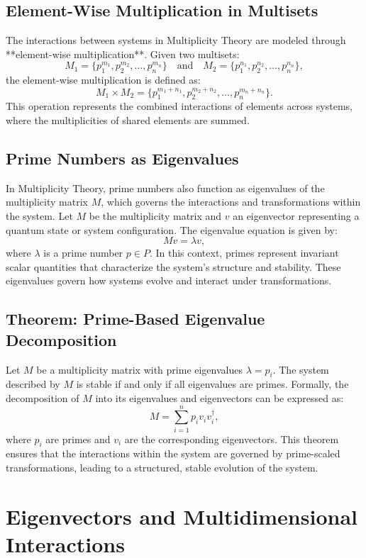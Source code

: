\documentclass[%
 preprint, linenumbers,
 amsmath,amssymb,
 aps, physrev,
]{revtex4-2}
\begin{document}
\subsection{Element-Wise Multiplication in Multisets}
The interactions between systems in Multiplicity Theory are modeled through **element-wise multiplication**. Given two multisets:
\[
M_1 = \{p_1^{m_1}, p_2^{m_2}, \dots, p_n^{m_n}\} \quad \text{and} \quad M_2 = \{p_1^{n_1}, p_2^{n_2}, \dots, p_n^{n_n}\},
\]
the element-wise multiplication is defined as:
\[
M_1 \times M_2 = \{p_1^{m_1 + n_1}, p_2^{m_2 + n_2}, \dots, p_n^{m_n + n_n}\}.
\]
This operation represents the combined interactions of elements across systems, where the multiplicities of shared elements are summed.

\subsection{Prime Numbers as Eigenvalues}
In Multiplicity Theory, prime numbers also function as eigenvalues of the multiplicity matrix \( M \), which governs the interactions and transformations within the system. Let \( M \) be the multiplicity matrix and \( v \) an eigenvector representing a quantum state or system configuration. The eigenvalue equation is given by:
\[
M v = \lambda v,
\]
where \( \lambda \) is a prime number \( p \in P \). In this context, primes represent invariant scalar quantities that characterize the system's structure and stability. These eigenvalues govern how systems evolve and interact under transformations.

\subsection{Theorem: Prime-Based Eigenvalue Decomposition}
Let \( M \) be a multiplicity matrix with prime eigenvalues \( \lambda = p_i \). The system described by \( M \) is stable if and only if all eigenvalues are primes. Formally, the decomposition of \( M \) into its eigenvalues and eigenvectors can be expressed as:
\[
M = \sum_{i=1}^{n} p_i v_i v_i^\dagger,
\]
where \( p_i \) are primes and \( v_i \) are the corresponding eigenvectors. This theorem ensures that the interactions within the system are governed by prime-scaled transformations, leading to a structured, stable evolution of the system.

\section{Eigenvectors and Multidimensional Interactions}
\end{document}
